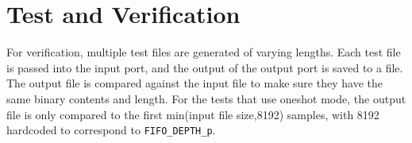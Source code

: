 \documentclass{article}
\begin{document}
\section*{Test and Verification}
\begin{flushleft}
For verification, multiple test files are generated of varying lengths. Each test file is passed into the input port, and the output of the output port is saved to a file. The output file is compared against the input file to make sure they have the same binary contents and length. For the tests that use oneshot mode, the output file is only compared to the first min(input file size,8192) samples, with 8192 hardcoded to correspond to \verb+FIFO_DEPTH_p+.
\end{flushleft}
\end{document}
